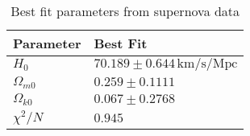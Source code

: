 \begin{table}[h]
\centering
\caption{Best fit parameters from supernova data}
\label{tab:M1:results:best_fit_supernova}
\begin{tabular}{ll}
\toprule
    Parameter &                               Best Fit \\
\midrule
        $H_0$ & $ 70.189 \pm 0.644\,\mathrm{km/s/Mpc}$ \\
$\Omega_{m0}$ &                    $ 0.259 \pm 0.1111$ \\
$\Omega_{k0}$ &                    $ 0.067 \pm 0.2768$ \\
   $\chi^2/N$ &                                $0.945$ \\
\bottomrule
\end{tabular}
\end{table}
